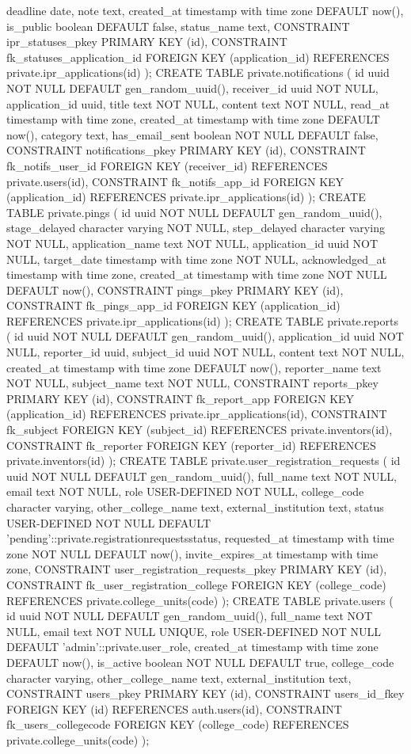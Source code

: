   deadline date,
  note text,
  created_at timestamp with time zone DEFAULT now(),
  is_public boolean DEFAULT false,
  status_name text,
  CONSTRAINT ipr_statuses_pkey PRIMARY KEY (id),
  CONSTRAINT fk_statuses_application_id FOREIGN KEY (application_id) REFERENCES private.ipr_applications(id)
);
CREATE TABLE private.notifications (
  id uuid NOT NULL DEFAULT gen_random_uuid(),
  receiver_id uuid NOT NULL,
  application_id uuid,
  title text NOT NULL,
  content text NOT NULL,
  read_at timestamp with time zone,
  created_at timestamp with time zone DEFAULT now(),
  category text,
  has_email_sent boolean NOT NULL DEFAULT false,
  CONSTRAINT notifications_pkey PRIMARY KEY (id),
  CONSTRAINT fk_notifs_user_id FOREIGN KEY (receiver_id) REFERENCES private.users(id),
  CONSTRAINT fk_notifs_app_id FOREIGN KEY (application_id) REFERENCES private.ipr_applications(id)
);
CREATE TABLE private.pings (
  id uuid NOT NULL DEFAULT gen_random_uuid(),
  stage_delayed character varying NOT NULL,
  step_delayed character varying NOT NULL,
  application_name text NOT NULL,
  application_id uuid NOT NULL,
  target_date timestamp with time zone NOT NULL,
  acknowledged_at timestamp with time zone,
  created_at timestamp with time zone NOT NULL DEFAULT now(),
  CONSTRAINT pings_pkey PRIMARY KEY (id),
  CONSTRAINT fk_pings_app_id FOREIGN KEY (application_id) REFERENCES private.ipr_applications(id)
);
CREATE TABLE private.reports (
  id uuid NOT NULL DEFAULT gen_random_uuid(),
  application_id uuid NOT NULL,
  reporter_id uuid,
  subject_id uuid NOT NULL,
  content text NOT NULL,
  created_at timestamp with time zone DEFAULT now(),
  reporter_name text NOT NULL,
  subject_name text NOT NULL,
  CONSTRAINT reports_pkey PRIMARY KEY (id),
  CONSTRAINT fk_report_app FOREIGN KEY (application_id) REFERENCES private.ipr_applications(id),
  CONSTRAINT fk_subject FOREIGN KEY (subject_id) REFERENCES private.inventors(id),
  CONSTRAINT fk_reporter FOREIGN KEY (reporter_id) REFERENCES private.inventors(id)
);
CREATE TABLE private.user_registration_requests (
  id uuid NOT NULL DEFAULT gen_random_uuid(),
  full_name text NOT NULL,
  email text NOT NULL,
  role USER-DEFINED NOT NULL,
  college_code character varying,
  other_college_name text,
  external_institution text,
  status USER-DEFINED NOT NULL DEFAULT 'pending'::private.registrationrequestsstatus,
  requested_at timestamp with time zone NOT NULL DEFAULT now(),
  invite_expires_at timestamp with time zone,
  CONSTRAINT user_registration_requests_pkey PRIMARY KEY (id),
  CONSTRAINT fk_user_registration_college FOREIGN KEY (college_code) REFERENCES private.college_units(code)
);
CREATE TABLE private.users (
  id uuid NOT NULL DEFAULT gen_random_uuid(),
  full_name text NOT NULL,
  email text NOT NULL UNIQUE,
  role USER-DEFINED NOT NULL DEFAULT 'admin'::private.user_role,
  created_at timestamp with time zone DEFAULT now(),
  is_active boolean NOT NULL DEFAULT true,
  college_code character varying,
  other_college_name text,
  external_institution text,
  CONSTRAINT users_pkey PRIMARY KEY (id),
  CONSTRAINT users_id_fkey FOREIGN KEY (id) REFERENCES auth.users(id),
  CONSTRAINT fk_users_collegecode FOREIGN KEY (college_code) REFERENCES private.college_units(code)
);